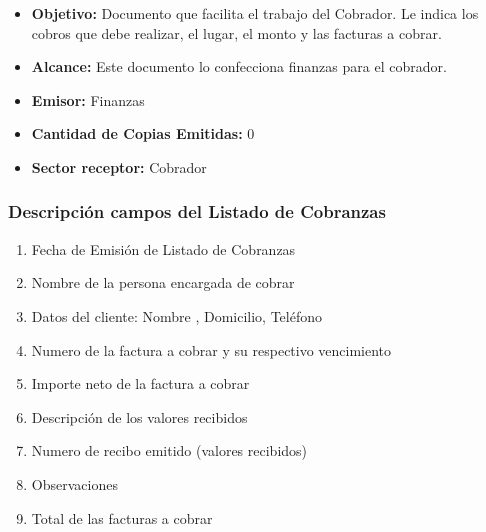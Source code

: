 \begin{itemize}
  \item \textbf{Objetivo:} Documento que facilita el trabajo del Cobrador. Le indica los cobros que debe realizar, el lugar, el monto y las facturas a cobrar.
  \item \textbf{Alcance:} Este documento lo confecciona finanzas para el cobrador.
  \item \textbf{Emisor:} Finanzas
  \item \textbf{Cantidad de Copias Emitidas:} 0
  \item \textbf{Sector receptor:} Cobrador
 \end{itemize}
 
\subsubsection{Descripci\'on campos del Listado de Cobranzas}
\begin{enumerate}
\item Fecha de Emisión de Listado de Cobranzas
\item Nombre de la persona encargada de cobrar
\item Datos del cliente: Nombre , Domicilio, Teléfono
\item Numero de la factura a cobrar y su respectivo vencimiento
\item Importe neto de la factura a cobrar
\item Descripción de los valores recibidos
\item Numero de recibo emitido (valores recibidos)
\item Observaciones
\item Total de las facturas a cobrar
\end{enumerate}



